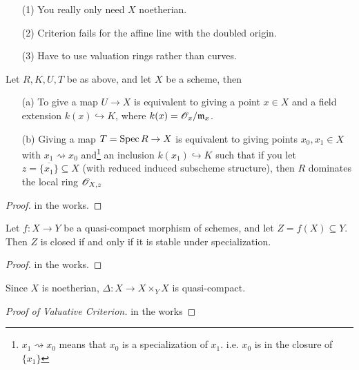 \begin{remark}
\begin{itemize}
 \item[(1)] You really only need $X$ noetherian.
 \item[(2)] Criterion fails for the affine line with the doubled
 origin.
 \item[(3)] Have to use valuation rings rather than curves.
\end{itemize}
\end{remark}

\begin{lemma}
Let $R,K,U,T$ be as above, and let $X$ be a scheme, then
\begin{itemize}
 \item[(a)] To give a map $U\to X$ is equivalent to giving a point
 $x\in X$ and a field extension $k(x)\hookrightarrow K$, where
 $k(x)=\mathscr{O}_x/\mathfrak{m}_x$.
 \item[(b)] Giving a map $T=\text{\rm Spec\,} R \to X$ is equivalent to giving
 points $x_0,x_1\in X$ with $x_1\rightsquigarrow x_0$
 and\footnote{$x_1\rightsquigarrow x_0$ means that $x_0$ is a
 specialization of $x_1$.  i.e. $x_0$ is in the closure of
 $\{x_1\}$} an inclusion $k(x_1)\hookrightarrow K$ such that if
 you let $z=\overline{\{x_1\}}\subseteq X$ (with reduced induced
 subscheme structure), then $R$ dominates the local ring
 $\mathscr{O}_{X,z}$
\end{itemize}
\end{lemma}
\begin{proof}
in the works.
\end{proof}

\begin{lemma}
Let $f:X\to Y$ be a quasi-compact morphism of schemes, and let
$Z=f(X)\subseteq Y$.  Then $Z$ is closed if and only if it is
stable under specialization.
\end{lemma}
\begin{proof}
in the works.
\end{proof}

\begin{remark}
Since $X$ is noetherian, $\Delta: X\to X\times_Y X$ is
quasi-compact.
\end{remark}

\begin{proof}[Proof of Valuative Criterion]
in the works

\renewcommand{\qedsymbol}{\text{\tiny proof continued in next lecture}}
\end{proof}
